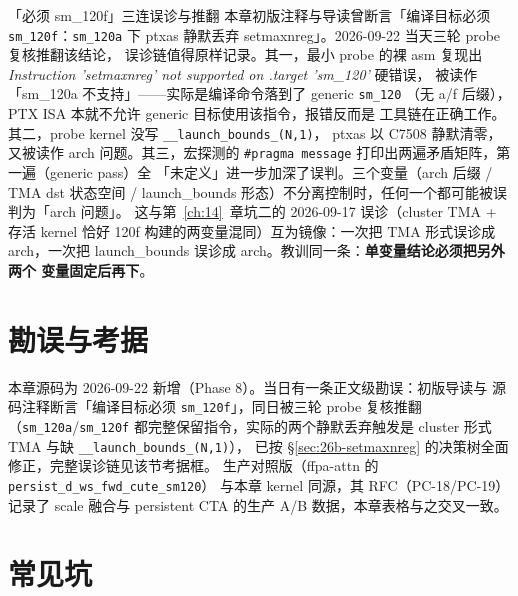 \begin{kaogu}[本章初版当日修正]{「必须 sm\_120f」三连误诊与推翻}
本章初版注释与导读曾断言「编译目标必须 \texttt{sm\_120f}：\texttt{sm\_120a} 下
ptxas 静默丢弃 setmaxnreg」。2026-09-22 当天三轮 probe 复核推翻该结论，
误诊链值得原样记录。其一，最小 probe 的裸 asm 复现出
\emph{Instruction 'setmaxnreg' not supported on .target 'sm\_120'} 硬错误，
被读作「sm\_120a 不支持」——实际是编译命令落到了 generic \texttt{sm\_120}
（无 a/f 后缀），PTX ISA 本就不允许 generic 目标使用该指令，报错反而是
工具链在正确工作。其二，probe kernel 没写 \texttt{\_\_launch\_\allowbreak{}bounds\_\allowbreak{}(N,1)}，
ptxas 以 C7508 静默清零，又被读作 arch 问题。其三，宏探测的
\texttt{\#pragma message} 打印出两遍矛盾矩阵，第一遍（generic pass）全
「未定义」进一步加深了误判。三个变量（arch 后缀 / TMA dst 状态空间 /
launch\_bounds 形态）不分离控制时，任何一个都可能被误判为「arch 问题」。
这与第~\ref{ch:14}~章坑二的 2026-09-17 误诊（cluster TMA + 存活 kernel 恰好
120f 构建的两变量混同）互为镜像：一次把 TMA 形式误诊成 arch，一次把
launch\_bounds 误诊成 arch。教训同一条：\textbf{单变量结论必须把另外两个
变量固定后再下}。
\end{kaogu}

\section{勘误与考据}\label{sec:26b-kaogu}

本章源码为 2026-09-22 新增（Phase 8）。当日有一条正文级勘误：初版导读与
源码注释断言「编译目标必须 \texttt{sm\_120f}」，同日被三轮 probe 复核推翻
（\texttt{sm\_120a}/\texttt{sm\_120f} 都完整保留指令，实际的两个静默丢弃触发是
cluster 形式 TMA 与缺 \texttt{\_\_launch\_\allowbreak{}bounds\_\allowbreak{}(N,1)}），
已按 \S\ref{sec:26b-setmaxnreg} 的决策树全面修正，完整误诊链见该节考据框。
生产对照版（ffpa-attn 的 \texttt{persist\_\allowbreak{}d\_\allowbreak{}ws\_\allowbreak{}fwd\_\allowbreak{}cute\_\allowbreak{}sm120}）
与本章 kernel 同源，其 RFC（PC-18/PC-19）记录了 scale 融合与 persistent CTA
的生产 A/B 数据，本章表格与之交叉一致。

\section{常见坑}\label{sec:26b-pitfalls}

